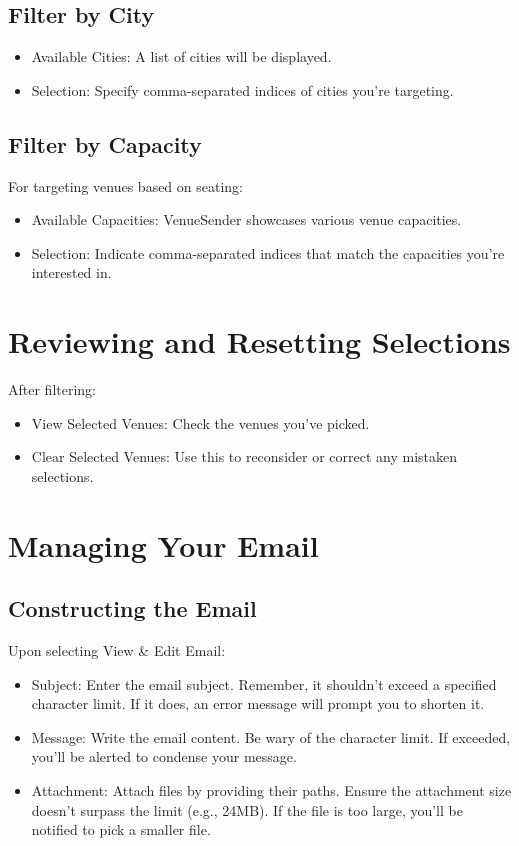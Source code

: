\documentclass{article}
\begin{document}
	\subsection*{Filter by City}
	\begin{itemize}
		\item Available Cities: A list of cities will be displayed.
		\item Selection: Specify comma-separated indices of cities you're targeting.
	\end{itemize}
	
	\subsection*{Filter by Capacity}
	For targeting venues based on seating:
	\begin{itemize}
		\item Available Capacities: VenueSender showcases various venue capacities.
		\item Selection: Indicate comma-separated indices that match the capacities you're interested in.
	\end{itemize}
	
	\section*{Reviewing and Resetting Selections}
	After filtering:
	\begin{itemize}
		\item View Selected Venues: Check the venues you've picked.
		\item Clear Selected Venues: Use this to reconsider or correct any mistaken selections.
	\end{itemize}
	
	\section*{Managing Your Email}
	\subsection*{Constructing the Email}
	Upon selecting View \& Edit Email:
	\begin{itemize}
		\item Subject: Enter the email subject. Remember, it shouldn't exceed a specified character limit. If it does, an error message will prompt you to shorten it.
		\item Message: Write the email content. Be wary of the character limit. If exceeded, you'll be alerted to condense your message.
		\item Attachment: Attach files by providing their paths. Ensure the attachment size doesn't surpass the limit (e.g., 24MB). If the file is too large, you'll be notified to pick a smaller file.
	\end{itemize}
	
\end{document}
